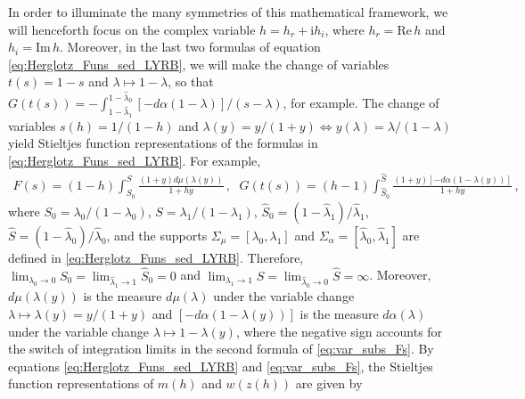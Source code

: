 \documentclass[english,12pt,jmp,graphicx]{revtex4-1}
\newcommand{\ph}{\hat{\phi}}
\newcommand{\I}{\mathrm{i}}
\begin{document}
In order to illuminate the many symmetries of this mathematical
framework,
we will henceforth focus on the
complex variable $h=h_r+\I h_i$, where $h_r=\text{Re}\,h$ and
$h_i=\text{Im}\,h$.
Moreover, in the last two formulas of equation 
\eqref{eq:Herglotz_Funs_sed_LYRB}, we will make the change of
variables $t(s)=1-s$ and $\lambda\mapsto1-\lambda$, so that
$G(t(s))=-\int_{1-\hat{\lambda}_1}^{1-\hat{\lambda}_0}[-d\alpha(1-\lambda)]/(s-\lambda)$, for 
example. The change of variables $s(h)=1/(1-h)$ and $\lambda(y)=y/(1+y)\iff
y(\lambda)=\lambda/(1-\lambda)$ yield Stieltjes function representations
\cite{Baker-1990} of the formulas in
\eqref{eq:Herglotz_Funs_sed_LYRB}. For example, 
%
\begin{align}\label{eq:var_subs_Fs}
  F(s)=%
                (1-h)\int_{S_0}^{S}\frac{(1+y)d\mu(\lambda(y))}{1+hy}
                \,,  \ \ \,
  G(t(s))=%
                (h-1)\int_{\hat{S}_0}^{\hat{S}}\frac{(1+y)[-d\alpha(1-\lambda(y))]}{1+hy}
                \,,               
\end{align}    
%
where $S_0=\lambda_0/(1-\lambda_0)$, $S=\lambda_1/(1-\lambda_1)$,
$\hat{S}_0=(1-\hat{\lambda}_1)/\hat{\lambda}_1$, 
$\hat{S}=(1-\hat{\lambda}_0)/\hat{\lambda}_0$, and the supports $\Sigma_\mu=[\lambda_0,\lambda_1]$ and
$\Sigma_\alpha=[\hat{\lambda}_0,\hat{\lambda}_1]$ are defined in
\eqref{eq:Herglotz_Funs_sed_LYRB}. Therefore,
$\lim_{\lambda_0\to0}S_0=\lim_{\hat{\lambda}_1\to1}\hat{S}_0=0$ and 
$\lim_{\lambda_1\to1}S=\lim_{\hat{\lambda}_0\to0}\hat{S}=\infty$. Moreover,
$d\mu(\lambda(y))$ is the measure $d\mu(\lambda)$ under the variable change
$\lambda\mapsto\lambda(y)=y/(1+y)$ and $[-d\alpha(1-\lambda(y))]$ is the measure $d\alpha(\lambda)$
under the variable change $\lambda\mapsto1-\lambda(y)$, where the negative sign accounts
for the switch of integration limits in the second formula of
\eqref{eq:var_subs_Fs}. By equations \eqref{eq:Herglotz_Funs_sed_LYRB}
and \eqref{eq:var_subs_Fs}, the Stieltjes function representations of
$m(h)$ and $w(z(h))$ are given 
by            
% 
\end{document}
